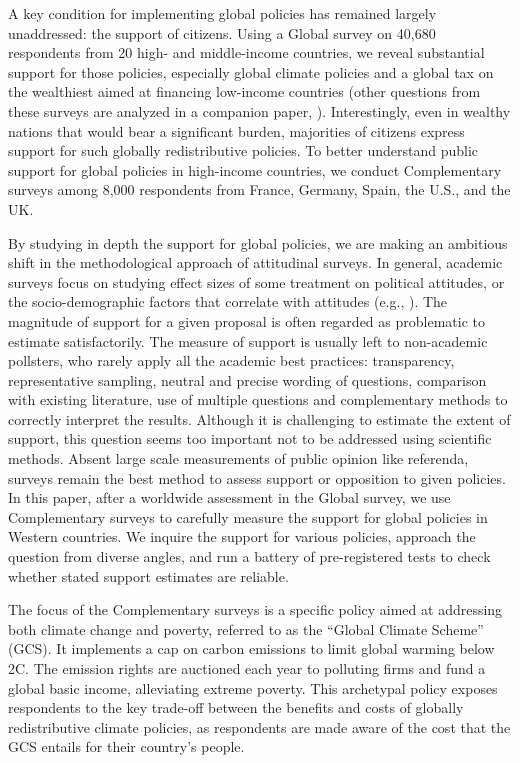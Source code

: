 A key condition for implementing global policies has remained largely unaddressed: the support of citizens. Using a Global survey on 40,680 respondents from 20 high- and middle-income countries, we reveal substantial support for those policies, especially global climate policies and a global tax on the wealthiest aimed at financing low-income countries (other questions from these surveys are analyzed in a companion paper, \citealp{dechezlepretre_fighting_2022}). Interestingly, even in wealthy nations that would bear a significant burden, majorities of citizens express support for such globally redistributive policies. To better understand public support for global policies in high-income countries, we conduct Complementary surveys among 8,000 respondents from France, Germany, Spain, the U.S., and the UK. 

By studying in depth the support for global policies, we are making an ambitious shift in the methodological approach of attitudinal surveys. In general, academic surveys focus on studying effect sizes of some treatment on political attitudes, or the socio-demographic factors that correlate with attitudes (e.g., \citealp{kuziemko_how_2015,douenne_yellow_2022}). The magnitude of support for a given proposal is often regarded as problematic to estimate satisfactorily. %
The measure of support is usually left to non-academic pollsters, who rarely apply all the academic best practices: transparency, representative sampling, neutral and precise wording of questions, comparison with existing literature, use of multiple questions and complementary methods to correctly interpret the results. Although it is challenging to estimate the extent of support, this question seems too important not to be addressed using scientific methods. Absent large scale measurements of public opinion like referenda, surveys remain the best method to assess support or opposition to given policies. In this paper, after a worldwide assessment in the Global survey, we use Complementary surveys to carefully measure the support for global policies in Western countries. We inquire the support for various policies, approach the question from diverse angles, and run a battery of pre-registered tests to check whether stated support estimates are reliable.

The focus of the Complementary surveys is a specific policy aimed at addressing both climate change and poverty, referred to as the ``Global Climate Scheme'' (GCS). It implements a cap on carbon emissions to limit global warming below 2\textdegree{}C. The emission rights are auctioned each year to polluting firms and fund a global basic income, alleviating extreme poverty. 
This archetypal policy exposes respondents to the key trade-off between the benefits and costs of globally redistributive climate policies, as respondents are made aware of the cost that the GCS entails for their country's people. 

